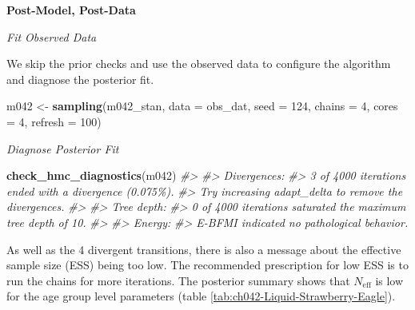 \documentclass[11pt, oneside, openany]{scrbook}
\newenvironment{Shaded}{\begin{snugshade}}{\end{snugshade}}
\newcommand{\AttributeTok}[1]{\textcolor[rgb]{0.13,0.29,0.53}{#1}}
\newcommand{\CommentTok}[1]{\textcolor[rgb]{0.56,0.35,0.01}{\textit{#1}}}
\newcommand{\DecValTok}[1]{\textcolor[rgb]{0.00,0.00,0.81}{#1}}
\newcommand{\FunctionTok}[1]{\textcolor[rgb]{0.13,0.29,0.53}{\textbf{#1}}}
\newcommand{\NormalTok}[1]{#1}
\newcommand{\OtherTok}[1]{\textcolor[rgb]{0.56,0.35,0.01}{#1}}
\begin{document}
\textbf{Post-Model, Post-Data}

\emph{Fit Observed Data}

We skip the prior checks and use the observed data to configure the algorithm and diagnose the posterior fit.


\begin{Shaded}
\begin{Highlighting}[]
\NormalTok{m042 }\OtherTok{\textless{}{-}} \FunctionTok{sampling}\NormalTok{(m042\_stan, }\AttributeTok{data =}\NormalTok{ obs\_dat, }\AttributeTok{seed =} \DecValTok{124}\NormalTok{,}
                 \AttributeTok{chains =} \DecValTok{4}\NormalTok{, }\AttributeTok{cores =} \DecValTok{4}\NormalTok{, }\AttributeTok{refresh =} \DecValTok{100}\NormalTok{)}
\end{Highlighting}
\end{Shaded}


\emph{Diagnose Posterior Fit}


\begin{Shaded}
\begin{Highlighting}[]
\FunctionTok{check\_hmc\_diagnostics}\NormalTok{(m042)}
\CommentTok{\#\textgreater{} }
\CommentTok{\#\textgreater{} Divergences:}
\CommentTok{\#\textgreater{} 3 of 4000 iterations ended with a divergence (0.075\%).}
\CommentTok{\#\textgreater{} Try increasing \textquotesingle{}adapt\_delta\textquotesingle{} to remove the divergences.}
\CommentTok{\#\textgreater{} }
\CommentTok{\#\textgreater{} Tree depth:}
\CommentTok{\#\textgreater{} 0 of 4000 iterations saturated the maximum tree depth of 10.}
\CommentTok{\#\textgreater{} }
\CommentTok{\#\textgreater{} Energy:}
\CommentTok{\#\textgreater{} E{-}BFMI indicated no pathological behavior.}
\end{Highlighting}
\end{Shaded}


As well as the 4 divergent transitions, there is also a message about the effective sample size (ESS) being too low. The recommended prescription for low ESS is to run the chains for more iterations. The posterior summary shows that \(N_{\mathrm{eff}}\) is low for the age group level parameters (table \ref{tab:ch042-Liquid-Strawberry-Eagle}).
\end{document}
